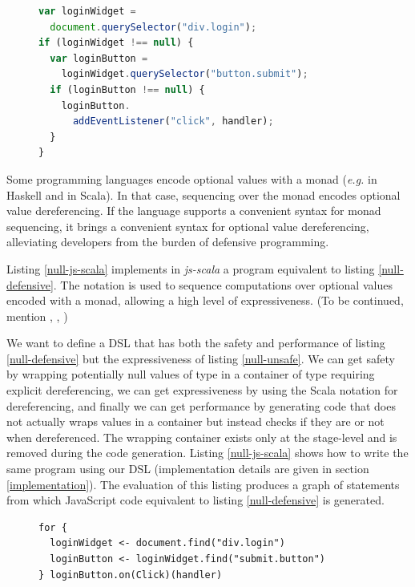\documentclass[preprint]{sigplanconf}
\newcommand{\eg}{\emph{e.g.}}
\begin{document}
\begin{figure}
\begin{lstlisting}[language=JavaScript,label=null-defensive,caption=Defensive programming to handle null references]
var loginWidget =
  document.querySelector("div.login");
if (loginWidget !== null) {
  var loginButton =
    loginWidget.querySelector("button.submit");
  if (loginButton !== null) {
    loginButton.
      addEventListener("click", handler);
  }
}
\end{lstlisting}
\end{figure}

Some programming languages encode optional values with a monad (\eg {} in Haskell and  in
Scala). In that case, sequencing over the monad encodes optional value dereferencing. If the language supports a
convenient syntax for monad sequencing, it brings a convenient syntax for optional value dereferencing, alleviating
developers from the burden of defensive programming.

Listing \ref{null-js-scala} implements in \emph{js-scala} a program equivalent to listing \ref{null-defensive}. The
 notation is used to sequence computations over optional values encoded with a monad, allowing a high
level of expressiveness. (To be continued, mention , , )

We want to define a DSL that has both the safety and performance of listing \ref{null-defensive} but the
expressiveness of listing \ref{null-unsafe}. We can get safety by wrapping potentially null values of type
 in a container of type  requiring explicit dereferencing, we can get
expressiveness by using the Scala  notation for dereferencing, and finally we can get performance by
generating code that does not actually wraps values in a container but instead checks if they are  or not
when dereferenced. The wrapping container exists only at the stage-level and is removed during the code generation.
Listing \ref{null-js-scala} shows how to write the same program using our DSL (implementation details are
given in section \ref{implementation}). The evaluation of this listing produces a graph of statements from which
JavaScript code equivalent to listing \ref{null-defensive} is generated.

\begin{figure}
\begin{lstlisting}[label=null-js-scala,caption=Handling null references in js-scala]
for {
  loginWidget <- document.find("div.login")
  loginButton <- loginWidget.find("submit.button")
} loginButton.on(Click)(handler)
\end{lstlisting}
\end{figure}
\end{document}
